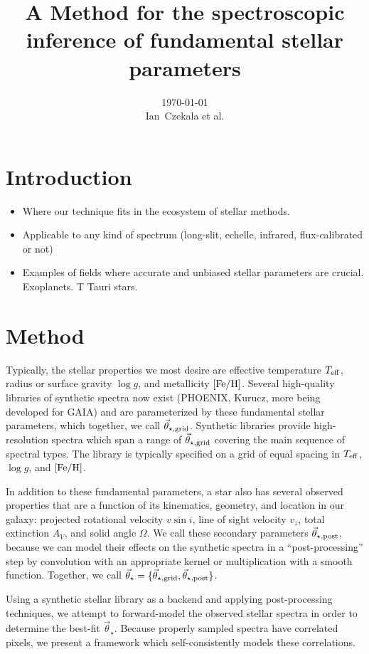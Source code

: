 \documentclass[preprint]{aastex} %
\newcommand{\vt}{\vec{\theta}}
\newcommand{\vg}{\vt_{\star, {\rm grid}}}
\newcommand{\vpp}{\vt_{\star, {\rm post}}}
\newcommand{\vstar}{\vt_{\star}}
\newcommand{\Z}{[{\rm Fe}/{\rm H}]}
\begin{document}
\title{A Method for the spectroscopic inference of fundamental stellar parameters}
\author{\today{}\\
\medskip
Ian~Czekala et al.
}


\section{Introduction}
\begin{itemize}
  \item Where our technique fits in the ecosystem of stellar methods.
  \item Applicable to any kind of spectrum (long-slit, echelle, infrared, flux-calibrated or not)
  \item Examples of fields where accurate and unbiased stellar parameters are crucial. Exoplanets. T Tauri stars.
\end{itemize}

\section{Method}
Typically, the stellar properties we most desire are effective temperature $T_{\rm eff}$, radius or surface gravity $\log g$, and metallicity $\Z$. Several high-quality libraries of synthetic spectra now exist (PHOENIX, Kurucz, more being developed for GAIA) and are parameterized by these fundamental stellar parameters, which together, we call $\vg$. Synthetic libraries provide high-resolution spectra which span a range of $\vg$ covering the main sequence of spectral types. The library is typically specified on a grid of equal spacing in $T_{\rm eff}$, $\log g$, and $\Z$.

In addition to these fundamental parameters, a star also has several observed properties that are a function of its kinematics, geometry, and location in our galaxy: projected rotational velocity $v \sin i$, line of sight velocity $v_z$, total extinction $A_V$, and solid angle $\Omega$. We call these secondary parameters $\vpp$, because we can model their effects on the synthetic spectra in a ``post-processing'' step by convolution with an appropriate kernel or multiplication with a smooth function. Together, we call $\vstar = \{\vg, \vpp\}$.

Using a synthetic stellar library as a backend and applying post-processing techniques, we attempt to forward-model the observed stellar spectra in order to determine the best-fit $\vstar$. Because properly sampled spectra have correlated pixels, we present a framework which self-consistently models these correlations. 
\end{document}
